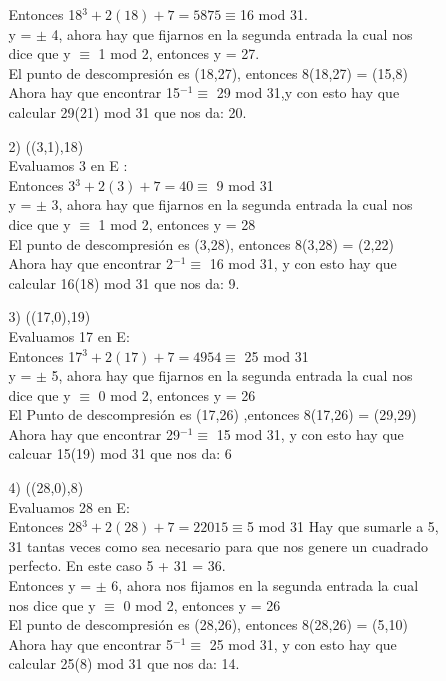 \documentclass[11pt,letterpaper]{article}
\begin{document}
\begin{enumerate}
\begin{itemize}
\begin{itemize}
Entonces 18$^{3} +2(18) + 7 = 5875 \equiv $16 mod 31.\\
y = $\pm$ 4, ahora hay que fijarnos en la segunda entrada la cual nos dice que y $\equiv$ 1 mod 2, entonces y = 27.\\
El punto de descompresión es (18,27), entonces 8(18,27) = (15,8)\\
Ahora hay que encontrar 15$^{-1} \equiv $ 29 mod 31,y con esto hay que calcular 29(21) mod 31 que nos da: 20.
\item[2)] ((3,1),18)\\
Evaluamos 3 en E :\\
Entonces 3$^{3} + 2(3) + 7 = 40 \equiv $ 9 mod 31\\
y = $\pm$ 3, ahora hay que fijarnos en la segunda entrada la cual nos dice que y $\equiv$ 1 mod 2, entonces y = 28 \\ 
El punto de descompresión es (3,28), entonces 8(3,28) = (2,22)\\
Ahora hay que encontrar 2$^{-1} \equiv$ 16 mod 31, y con esto hay que calcular 16(18) mod 31 que nos da: 9.
\item[3)] ((17,0),19)\\
Evaluamos 17 en E:\\
Entonces 17$^{3} + 2(17) + 7 = 4954 \equiv$ 25 mod 31\\
y = $\pm$ 5, ahora hay que fijarnos en la segunda entrada la cual nos dice que y $\equiv$ 0 mod 2, entonces y = 26\\
El Punto de descompresión es (17,26) ,entonces 8(17,26) = (29,29)\\
Ahora hay que encontrar 29$^{-1} \equiv$ 15 mod 31, y con esto hay que calcuar 15(19) mod 31 que nos da: 6
\item[4)] ((28,0),8) \\
Evaluamos 28 en E:\\
Entonces 28$^{3} + 2(28) + 7 = 22015 \equiv $5 mod 31
Hay que sumarle a 5, 31 tantas veces como sea necesario para que nos genere un cuadrado perfecto. En este caso 5 + 31 = 36.\\
Entonces y = $\pm$ 6, ahora nos fijamos en la segunda entrada la cual nos dice que y $\equiv$ 0 mod 2, entonces  y = 26\\
El punto de descompresión es (28,26), entonces 8(28,26) = (5,10)\\
Ahora hay que encontrar 5$^{-1} \equiv$ 25 mod 31, y con esto hay que calcular 25(8) mod 31 que nos da: 14.



\end{itemize}
\end{itemize}
\end{enumerate}
\end{document}
